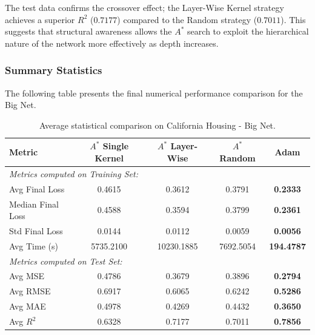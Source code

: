 The test data confirms the crossover effect; the Layer-Wise Kernel strategy achieves a superior $R^2$ ($0.7177$) compared to the Random strategy ($0.7011$). This suggests that structural awareness allows the $A^*$ search to exploit the hierarchical nature of the network more effectively as depth increases.

\subsubsection{Summary Statistics}

The following table presents the final numerical performance comparison for the Big Net.

\begin{table}[htbp]
\centering
\scriptsize
\begin{tabular}{|l|c|c|c|c|}
\hline
\textbf{Metric}   & \textbf{$A^*$ Single Kernel} & \textbf{$A^*$ Layer-Wise} & \textbf{$A^*$ Random} & \textbf{Adam} \\ \hline
\multicolumn{5}{|l|}{\textit{Metrics computed on Training Set:}} \\ \hline
Avg Final Loss          & 0.4615                       & 0.3612                    & 0.3791                & \textbf{0.2333} \\ 
Median Final Loss       & 0.4588                       & 0.3594                    & 0.3799                & \textbf{0.2361} \\
Std Final Loss          & 0.0144                       & 0.0112                    & 0.0059                & \textbf{0.0056} \\ \hline
Avg Time (s)            & 5735.2100                    & 10230.1885                & 7692.5054             & \textbf{194.4787} \\ \hline
\multicolumn{5}{|l|}{\textit{Metrics computed on Test Set:}} \\ \hline
Avg MSE                 & 0.4786                       & 0.3679                    & 0.3896                & \textbf{0.2794} \\ 
Avg RMSE                & 0.6917                       & 0.6065                    & 0.6242                & \textbf{0.5286} \\ 
Avg MAE                 & 0.4978                       & 0.4269                    & 0.4432                & \textbf{0.3650} \\ 
Avg $R^2$               & 0.6328                       & 0.7177                    & 0.7011                & \textbf{0.7856} \\ \hline
\end{tabular}
\caption{Average statistical comparison on California Housing - Big Net.}
\label{tab:big_net_california}
\end{table}

